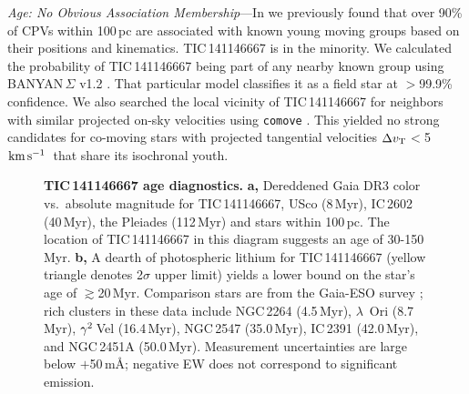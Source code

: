 \documentclass[11pt,twocolumn,tighten]{aastex7}
\newcommand{\kms}{\ensuremath{\rm km\,s^{-1}}}
\begin{document}
{\it Age: No Obvious Association Membership}---In \citet{Bouma2024} we
previously found that over 90\% of CPVs within 100\,pc are associated
with known young moving groups based on their positions and
kinematics.  TIC\,141146667 is in the minority.  We calculated the
probability of TIC\,141146667 being part of any nearby known group
using BANYAN\,$\Sigma$ v1.2 \citep{Gagne2018}.  That particular model
classifies it as a field star at $>$99.9\% confidence.  We also
searched the local vicinity of TIC\,141146667 for neighbors with
similar projected on-sky velocities using \texttt{comove}
\citep{Tofflemire2021}.  This yielded no strong candidates for
co-moving stars with projected tangential velocities $\Delta v_{\rm
T}$$<$5\,\kms\ that share its isochronal youth.

\begin{figure}[!t]
	\begin{center}
	\end{center}
	\vspace{-0.3cm}
  \caption{{\bf TIC\,141146667 age diagnostics.}
  {\bf a,} Dereddened Gaia DR3 color vs.~absolute magnitude for
  TIC\,141146667, USco (8\,Myr), IC\,2602 (40\,Myr), the Pleiades
  (112\,Myr) and stars within 100\,pc. 
  The location of TIC\,141146667 in this diagram suggests an age of
  30-150\,Myr. 
  {\bf b,} A dearth of photospheric lithium for TIC\,141146667 (yellow
  triangle denotes 2$\sigma$ upper limit) yields a lower bound on the
  star's age of $\gtrsim$20\,Myr.  Comparison stars are from the
  Gaia-ESO survey \citep{Jeffries2023}; rich clusters in these data
  include NGC\,2264 (4.5\,Myr), $\lambda$~Ori (8.7\,Myr), ${\rm
  \gamma}^2$\,Vel (16.4\,Myr), NGC\,2547 (35.0\,Myr), IC\,2391
  (42.0\,Myr), and NGC\,2451A (50.0\,Myr). Measurement
  uncertainties are large below $+$50\,m\AA; negative EW does not
  correspond to significant emission.}
  \label{fig:age_diagnostics}
\end{figure}
\end{document}
